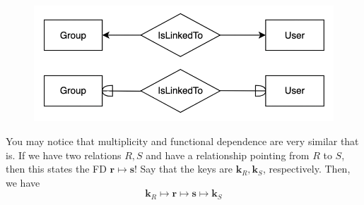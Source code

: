 \documentclass{article}
\begin{document}
\begin{definition}
\begin{enumerate}
        \begin{figure}[H]
          \centering 
          \includegraphics[scale=0.3]{img/islinked.png}
          \caption{} 
          \label{fig:islinked}
        \end{figure}
        \end{enumerate}
      \end{definition}

      \begin{theorem}
        You may notice that multiplicity and functional dependence are very similar that is. If we have two relations $R, S$ and have a relationship pointing from $R$ to $S$, then this states the FD $\mathbf{r} \mapsto \mathbf{s}$! Say that the keys are $\mathbf{k}_R, \mathbf{k}_S$, respectively. Then, we have 
        \begin{equation}
          \mathbf{k}_R \mapsto \mathbf{r} \mapsto \mathbf{s} \mapsto \mathbf{k}_S
        \end{equation} 
      \end{theorem}
\end{document}
